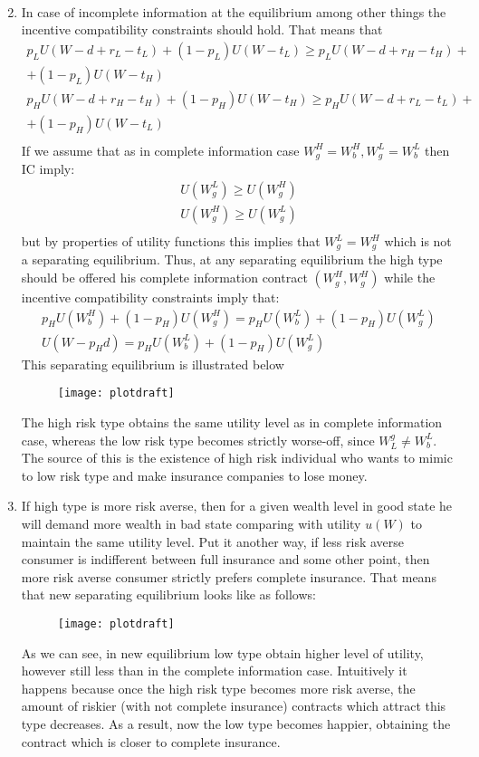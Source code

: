 \documentclass[a4paper]{article}
\begin{document}
\begin{enumerate}
\begin{align*}
\end{align*}
\item In case of incomplete information at the equilibrium among other things the incentive compatibility constraints should hold. That means that 
\begin{align*}
p_L U(W - d + r_L - t_L) + (1 - p_L)U(W - t_L) \ge p_L U(W - d + r_H - t_H) + \\
+(1 - p_L)U(W - t_H)\\
p_H U(W - d + r_H - t_H) + (1 - p_H)U(W - t_H) \ge p_H U(W - d + r_L - t_L) + \\
+ (1 - p_H)U(W - t_L)\\
\end{align*}
If we assume that as in complete information case $W_g^H = W_b^H, W_g^L = W_b^L$ then IC imply:
\begin{align*}
U(W^L_g) \ge U(W^H_g)\\
U(W^H_g) \ge U(W^L_g)\\
\end{align*}
but by properties of utility functions this implies that $W^L_g = W^H_g$ which is not a separating equilibrium. Thus, at any separating equilibrium the high type should be offered his complete information contract $(W_g^H, W_g^H)$ while the incentive compatibility constraints imply that:
\begin{align*}
p_HU(W_b^H) + (1 - p_H)U(W_g^H) = p_H U(W_b^L) + (1 - p_H)U(W_g^L)\\
U(W - p_Hd) = p_HU(W_b^L) + (1 -p_H)U(W_g^L)
\end{align*}
This separating equilibrium is illustrated below
	\begin{figure}[H]
	\centering
	\texttt{[image: plotdraft]}
	\caption{}\label{fig2}
\end{figure}
The high risk type obtains the same utility level as in complete information case, whereas the low risk type becomes strictly worse-off, since $W^g_L \neq W_b^L$. The source of this is the existence of high risk individual who wants to mimic to low risk type and make insurance companies to lose money.
\item If high type is more risk averse, then for a given wealth level in good state he will demand more wealth in bad state comparing with utility $u(W)$ to maintain the same utility level. Put it another way, if less risk averse consumer is indifferent between full insurance and some other point, then more risk averse consumer strictly prefers complete insurance. That means that new separating equilibrium looks like as follows:
	\begin{figure}[H]
	\centering
	\texttt{[image: plotdraft]}
	\caption{}\label{fig3}
\end{figure}
As we can see, in new equilibrium low type obtain higher level of utility, however still less than in the complete information case. Intuitively it happens because once the high risk type becomes more risk averse, the amount of riskier (with not complete insurance) contracts which attract this type decreases. As a result, now the low type becomes happier, obtaining the contract which is closer to complete insurance. 
\end{enumerate}
\end{document}
